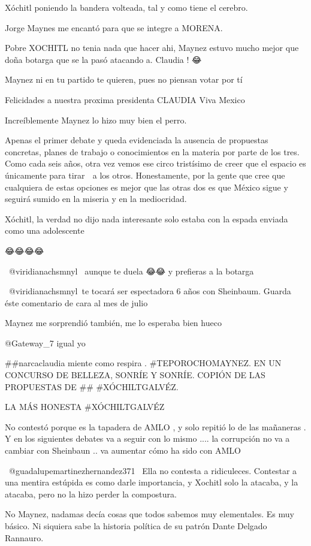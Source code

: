 Xóchitl poniendo la bandera volteada, tal y como tiene el cerebro.

Jorge Maynes me encantó para que se integre a MORENA.

Pobre XOCHITL no tenia nada que hacer ahi, Maynez estuvo mucho mejor que doña botarga que se la pasó atacando a. Claudia ! 😂

Maynez ni en tu partido te quieren, pues no piensan votar por tí

Felicidades a nuestra proxima presidenta CLAUDIA Viva Mexico

Increíblemente Maynez lo hizo muy bien el perro. 🫡🫡🫡🫡

Apenas el primer debate y queda evidenciada la ausencia de propuestas concretas, planes de trabajo o conocimientos en la materia por parte de los tres. Como cada seis años, otra vez vemos ese circo tristísimo de creer que el espacio es únicamente para tirar 💩 a los otros. Honestamente, por la gente que cree que cualquiera de estas opciones es mejor que las otras dos es que México sigue y seguirá sumido en la miseria y en la mediocridad.

Xóchitl, la verdad no dijo nada interesante solo estaba con la espada enviada como una adolescente

😂😂😂😂

 @viridianachsmnyl  aunque te duela 😂😂 y prefieras a la botarga

​ @viridianachsmnyl te tocará ser espectadora 6 años con Sheinbaum.  Guarda éste comentario de cara al mes de julio 🚬🗿

Maynez me sorprendió también, me lo esperaba bien hueco

​@Gateway_7 igual yo

##narcaclaudia miente como respira .  #TEPOROCHOMAYNEZ.   EN UN CONCURSO DE BELLEZA, SONRÍE Y SONRÍE. COPIÓN DE LAS PROPUESTAS DE ## #XÓCHILTGALVÉZ.

LA MÁS HONESTA #XÓCHILTGALVÉZ

No contestó  porque es la tapadera  de AMLO , y solo repitió  lo de las mañaneras  . Y en los siguientes debates va a seguir con lo mismo .... la corrupción no va a cambiar con Sheinbaun .. va aumentar cómo ha sido con  AMLO

 @guadalupemartinezhernandez371  Ella no contesta a ridiculeces. Contestar a una mentira estúpida es como darle importancia, y Xochitl solo la atacaba, y la atacaba, pero no la hizo perder la compostura.

No Maynez, nadamas decía cosas que todos sabemos muy elementales. Es muy básico. Ni siquiera sabe la historia política  de su patrón Dante Delgado Rannauro.

